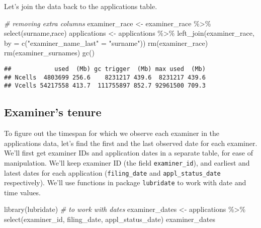 \documentclass[
]{article}
\newenvironment{Shaded}{\begin{snugshade}}{\end{snugshade}}
\newcommand{\AttributeTok}[1]{\textcolor[rgb]{0.77,0.63,0.00}{#1}}
\newcommand{\CommentTok}[1]{\textcolor[rgb]{0.56,0.35,0.01}{\textit{#1}}}
\newcommand{\FunctionTok}[1]{\textcolor[rgb]{0.00,0.00,0.00}{#1}}
\newcommand{\NormalTok}[1]{#1}
\newcommand{\OtherTok}[1]{\textcolor[rgb]{0.56,0.35,0.01}{#1}}
\newcommand{\SpecialCharTok}[1]{\textcolor[rgb]{0.00,0.00,0.00}{#1}}
\newcommand{\StringTok}[1]{\textcolor[rgb]{0.31,0.60,0.02}{#1}}
\begin{document}
Let's join the data back to the applications table.

\begin{Shaded}
\begin{Highlighting}[]
\CommentTok{\# removing extra columns}
\NormalTok{examiner\_race }\OtherTok{\textless{}{-}}\NormalTok{ examiner\_race }\SpecialCharTok{\%\textgreater{}\%} 
  \FunctionTok{select}\NormalTok{(surname,race)}
\NormalTok{applications }\OtherTok{\textless{}{-}}\NormalTok{ applications }\SpecialCharTok{\%\textgreater{}\%} 
  \FunctionTok{left\_join}\NormalTok{(examiner\_race, }\AttributeTok{by =} \FunctionTok{c}\NormalTok{(}\StringTok{"examiner\_name\_last"} \OtherTok{=} \StringTok{"surname"}\NormalTok{))}
\FunctionTok{rm}\NormalTok{(examiner\_race)}
\FunctionTok{rm}\NormalTok{(examiner\_surnames)}
\FunctionTok{gc}\NormalTok{()}
\end{Highlighting}
\end{Shaded}

\begin{verbatim}
##            used  (Mb) gc trigger  (Mb) max used  (Mb)
## Ncells  4803699 256.6    8231217 439.6  8231217 439.6
## Vcells 54217558 413.7  111755897 852.7 92961500 709.3
\end{verbatim}

\hypertarget{examiners-tenure}{%
\subsection{Examiner's tenure}\label{examiners-tenure}}

To figure out the timespan for which we observe each examiner in the
applications data, let's find the first and the last observed date for
each examiner. We'll first get examiner IDs and application dates in a
separate table, for ease of manipulation. We'll keep examiner ID (the
field \texttt{examiner\_id}), and earliest and latest dates for each
application (\texttt{filing\_date} and \texttt{appl\_status\_date}
respectively). We'll use functions in package \texttt{lubridate} to work
with date and time values.

\begin{Shaded}
\begin{Highlighting}[]
\FunctionTok{library}\NormalTok{(lubridate) }\CommentTok{\# to work with dates}
\NormalTok{examiner\_dates }\OtherTok{\textless{}{-}}\NormalTok{ applications }\SpecialCharTok{\%\textgreater{}\%} 
  \FunctionTok{select}\NormalTok{(examiner\_id, filing\_date, appl\_status\_date) }
\NormalTok{examiner\_dates}
\end{Highlighting}
\end{Shaded}
\end{document}
